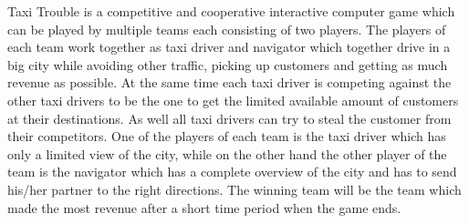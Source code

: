 Taxi Trouble is a competitive and cooperative interactive computer game which can be played by multiple teams each consisting of two players. The players of each team work together as taxi driver and navigator which together drive in a big city while avoiding other traffic, picking up customers and getting as much revenue as possible. At the same time each taxi driver is competing against the other taxi drivers to be the one to get the limited available amount of customers at their destinations. As well all taxi drivers can try to steal the customer from their competitors. One of the players of each team is the taxi driver which has only a limited view of the city, while on the other hand the other player of the team is the navigator which has a complete overview of the city and has to send his/her partner to the right directions. The winning team will be the team which made the most revenue after a short time period when the game ends.




